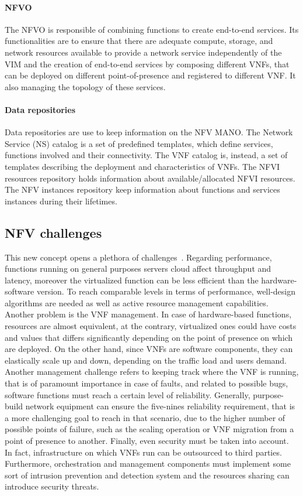\paragraph*{NFVO}
The NFVO is responsible of combining functions to create end-to-end services.
Its functionalities are to ensure that there are adequate compute, storage, and
network resources available to provide a network service independently of the
VIM and the creation of end-to-end services by composing different VNFs, that
can be deployed on different point-of-presence and registered to different VNF.
It also managing the topology of these services. 

\paragraph*{Data repositories} Data repositories are use to keep information on
the NFV MANO. The Network Service (NS) catalog is a set of predefined templates,
which define services, functions involved and their connectivity. The VNF
catalog is, instead, a set of templates describing the deployment and
characteristics of VNFs. The NFVI resources repository holds information about
available/allocated NFVI resources. The NFV instances repository keep
information about functions and services instances during their lifetimes.

\subsection{NFV challenges}
This new concept opens a plethora of challenges~\cite{han2015network}. Regarding
performance, functions running on general purposes servers cloud affect
throughput and latency, moreover the virtualized function can be less efficient
than the hardware-software version. To reach comparable levels in terms of
performance, well-design algorithms are needed as well as active resource
management capabilities. Another problem is the VNF management. In case of
hardware-based functions, resources are almost equivalent, at the contrary,
virtualized ones could have costs and values that differs significantly
depending on the point of presence on which are deployed. On the other hand,
since VNFs are software components, they can elastically scale up and down,
depending on the traffic load and users demand. Another management challenge
refers to keeping track where the VNF is running, that is of paramount
importance in case of faults, and related to possible bugs, software functions
must reach a certain level of reliability. Generally, purpose-build network
equipment can ensure the five-nines reliability requirement, that is a more
challenging goal to reach in that scenario, due to the higher number of possible
points of failure, such as the scaling operation or VNF migration from a point
of presence to another. Finally, even security must be taken into account. In
fact, infrastructure on which VNFs run can be outsourced to third parties.
Furthermore, orchestration and management components must implement some sort of
intrusion prevention and detection system and the resources sharing can
introduce security threats.


